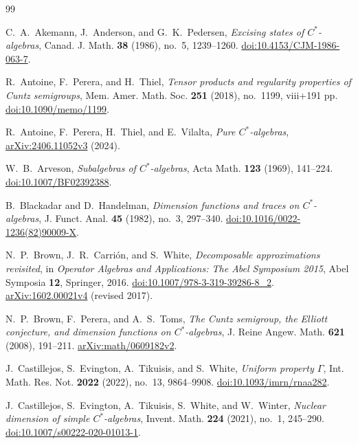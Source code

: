 \begin{thebibliography}{99}
\raggedright

C.~A.~Akemann, J.~Anderson, and G.~K.~Pedersen,
\emph{Excising states of $C^*$-algebras},
Canad. J. Math. \textbf{38} (1986), no.~5, 1239--1260.
\href{https://doi.org/10.4153/CJM-1986-063-7}{doi:10.4153/CJM-1986-063-7}.

R.~Antoine, F.~Perera, and H.~Thiel,
\emph{Tensor products and regularity properties of Cuntz semigroups},
Mem. Amer. Math. Soc. \textbf{251} (2018), no.~1199, viii+191 pp.
\href{https://doi.org/10.1090/memo/1199}{doi:10.1090/memo/1199}.

R.~Antoine, F.~Perera, H.~Thiel, and E.~Vilalta,
\emph{Pure $C^*$-algebras},
\href{https://arxiv.org/abs/2406.11052v3}{arXiv:2406.11052v3} (2024).

W.~B.~Arveson,
\emph{Subalgebras of \(C^*\)-algebras},
Acta Math. \textbf{123} (1969), 141--224.
\href{https://doi.org/10.1007/BF02392388}{doi:10.1007/BF02392388}.

B.~Blackadar and D.~Handelman,
\emph{Dimension functions and traces on $C^*$-algebras},
J. Funct. Anal. \textbf{45} (1982), no.~3, 297--340.
\href{https://doi.org/10.1016/0022-1236(82)90009-X}{doi:10.1016/0022-1236(82)90009-X}.

N.~P.~Brown, J.~R.~Carri\'on, and S.~White,
\emph{Decomposable approximations revisited},
in \emph{Operator Algebras and Applications: The Abel Symposium 2015},
Abel Symposia \textbf{12}, Springer, 2016.
\href{https://doi.org/10.1007/978-3-319-39286-8_2}{doi:10.1007/978-3-319-39286-8\_2}.
\href{https://arxiv.org/abs/1602.00021v4}{arXiv:1602.00021v4}
(revised 2017).

N.~P.~Brown, F.~Perera, and A.~S.~Toms,
\emph{The Cuntz semigroup, the Elliott conjecture, and dimension functions on $C^*$-algebras},
J. Reine Angew. Math. \textbf{621} (2008), 191--211.
\href{https://arxiv.org/abs/math/0609182v2}{arXiv:math/0609182v2}.

J.~Castillejos, S.~Evington, A.~Tikuisis, and S.~White,
\emph{Uniform property $\Gamma$},
Int. Math. Res. Not. \textbf{2022} (2022), no.~13, 9864--9908.
\href{https://doi.org/10.1093/imrn/rnaa282}{doi:10.1093/imrn/rnaa282}.

J.~Castillejos, S.~Evington, A.~Tikuisis, S.~White, and W.~Winter,
\emph{Nuclear dimension of simple $C^*$-algebras},
Invent. Math. \textbf{224} (2021), no.~1, 245--290.
\href{https://doi.org/10.1007/s00222-020-01013-1}{doi:10.1007/s00222-020-01013-1}.


\end{thebibliography}
